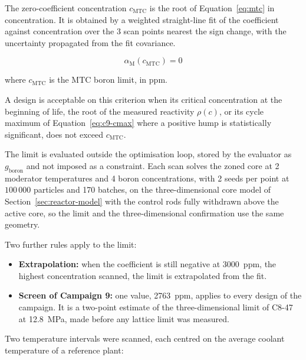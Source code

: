 The zero-coefficient concentration $c_\mathrm{MTC}$ is the root of
Equation~\eqref{eq:mtc} in concentration. It is obtained by a weighted
straight-line fit of the coefficient against concentration over the
3 scan points nearest the sign change, with the uncertainty
propagated from the fit covariance.

\begin{equation}
\alpha_\mathrm{M}\!\left(c_\mathrm{MTC}\right) = 0
\label{eq:ceiling}
\end{equation}

\noindent where $c_\mathrm{MTC}$ is the MTC boron limit, in ppm.

A design is acceptable on this criterion when its critical concentration
at the beginning of life, the root of the measured reactivity $\rho(c)$, or
its cycle maximum of Equation~\eqref{eq:c9-cmax} where a positive hump is statistically significant, does not exceed $c_\mathrm{MTC}$.

The limit is evaluated outside the optimisation loop, stored by the evaluator as $g_\mathrm{boron}$ and not imposed as a constraint. Each
scan solves the zoned core at 2 moderator temperatures and 4 boron
concentrations, with 2 seeds per point at $100\,000$ particles and 170
batches, on the three-dimensional core model of
Section~\ref{sec:reactor-model} with the control rods fully withdrawn
above the active core, so the limit and the three-dimensional
confirmation use the same geometry.

Two further rules apply to the limit:

\begin{itemize}
  \item \textbf{Extrapolation:} when the coefficient is still negative at
        \SI{3000}{ppm}, the highest concentration scanned, the limit is
        extrapolated from the fit.
  \item \textbf{Screen of Campaign 9:} one value, \SI{2763}{ppm}, applies
        to every design of the campaign. It is a two-point estimate of the
        three-dimensional limit of C8-47 at \SI{12.8}{MPa}, made before
        any lattice limit was measured.
\end{itemize}

Two temperature intervals were scanned, each centred on the average
coolant temperature of a reference plant:

